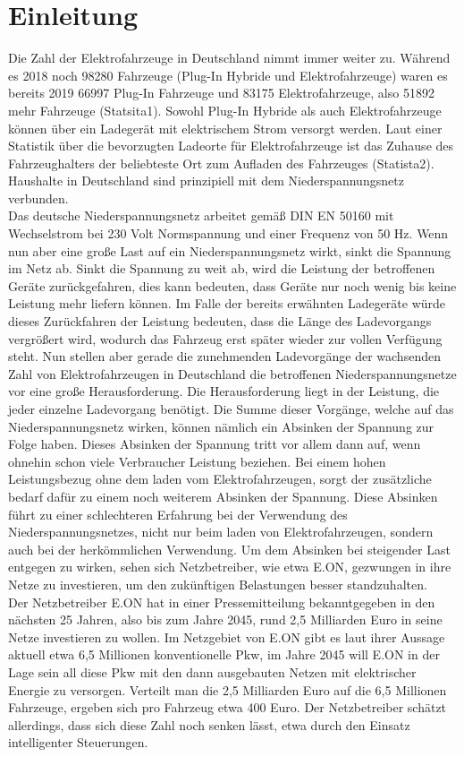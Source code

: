 \chapter{Einleitung}

Die Zahl der Elektrofahrzeuge in Deutschland nimmt immer weiter zu. Während es 2018 noch 98280 Fahrzeuge (Plug-In Hybride und Elektrofahrzeuge) waren es bereits 2019 66997 Plug-In Fahrzeuge und 83175 Elektrofahrzeuge, also 51892 mehr Fahrzeuge (Statsita1). Sowohl Plug-In Hybride als auch Elektrofahrzeuge können über ein Ladegerät mit elektrischem Strom versorgt werden. Laut einer Statistik über die bevorzugten Ladeorte für Elektrofahrzeuge ist das Zuhause des Fahrzeughalters der beliebteste Ort zum Aufladen des Fahrzeuges (Statista2). Haushalte in Deutschland sind prinzipiell mit dem Niederspannungsnetz verbunden. \\
Das deutsche Niederspannungsnetz arbeitet gemäß DIN EN 50160 mit Wechselstrom bei 230 Volt Normspannung und einer Frequenz von 50 Hz. Wenn nun aber eine große Last auf ein Niederspannungsnetz wirkt, sinkt die Spannung im Netz ab. Sinkt die Spannung zu weit ab, wird die Leistung der betroffenen Geräte zurückgefahren, dies kann bedeuten, dass Geräte nur noch wenig bis keine Leistung mehr liefern können. Im Falle der bereits erwähnten Ladegeräte würde dieses Zurückfahren der Leistung bedeuten, dass die Länge des Ladevorgangs vergrößert wird, wodurch das Fahrzeug erst später wieder zur vollen Verfügung steht. Nun stellen aber gerade die zunehmenden Ladevorgänge der wachsenden Zahl von Elektrofahrzeugen in Deutschland die betroffenen Niederspannungsnetze vor eine große Herausforderung. Die Herausforderung liegt in der Leistung, die jeder einzelne Ladevorgang benötigt. Die Summe dieser Vorgänge, welche auf das Niederspannungsnetz wirken, können nämlich ein Absinken der Spannung zur Folge haben. Dieses Absinken der Spannung tritt vor allem dann auf, wenn ohnehin schon viele Verbraucher Leistung beziehen. Bei einem hohen Leistungsbezug ohne dem laden vom Elektrofahrzeugen, sorgt der zusätzliche bedarf dafür zu einem noch weiterem Absinken der Spannung. Diese Absinken führt zu einer schlechteren Erfahrung bei der Verwendung des Niederspannungsnetzes, nicht nur beim laden von Elektrofahrzeugen, sondern auch bei der herkömmlichen Verwendung. Um dem Absinken bei steigender Last entgegen zu wirken, sehen sich Netzbetreiber, wie etwa E.ON, gezwungen in ihre Netze zu investieren, um den zukünftigen Belastungen besser standzuhalten. \\
Der Netzbetreiber E.ON hat in einer Pressemitteilung bekanntgegeben in den nächsten 25 Jahren, also bis zum Jahre 2045, rund 2,5 Milliarden Euro in seine Netze investieren zu wollen. Im Netzgebiet von E.ON gibt es laut ihrer Aussage aktuell etwa 6,5 Millionen konventionelle Pkw, im Jahre 2045 will E.ON in der Lage sein all diese Pkw mit den dann ausgebauten Netzen mit elektrischer Energie zu versorgen. Verteilt man die 2,5 Milliarden Euro auf die 6,5 Millionen Fahrzeuge, ergeben sich pro Fahrzeug etwa 400 Euro. Der Netzbetreiber schätzt allerdings, dass sich diese Zahl noch senken lässt, etwa durch den Einsatz intelligenter Steuerungen. \\
